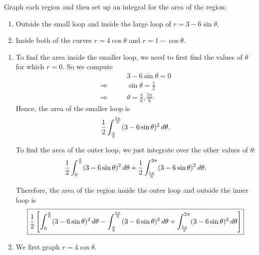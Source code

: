 \documentclass[]{ximera}
\begin{document}
\begin{problem}
Graph each region and then set up an integral for the area of the region:
	\begin{enumerate}
	\item  Outside the small loop and inside the large loop of $r = 3 - 6 \sin \theta$.
	\item  Inside both of the curves $r = 4 \cos \theta$ and $r = 1 - \cos \theta$.
	\end{enumerate} 
	
	
	\begin{freeResponse}
	\begin{enumerate}
	\item  
		
	To find the area inside the smaller loop, we need to first find the values of $\theta$ for which $r = 0$.
	So we compute
		\begin{align*}
		&3 - 6 \sin \theta = 0  \\
		\Longrightarrow \qquad &\sin \theta = \frac{1}{2}  \\
		\Longrightarrow \qquad &\theta = \frac{\pi}{6}, \frac{5 \pi}{6}.
		\end{align*}
	Hence, the area of the smaller loop is
		\[
		\frac{1}{2} \int_{\frac{\pi}{6}}^{\frac{5 \pi}{6}} (3 - 6 \sin \theta)^2 \,d \theta.
		\]
		
	To find the area of the outer loop, we just integrate over the other values of $\theta$:
		\[
		\frac{1}{2} \int_0^{\frac{\pi}{6}} (3 - 6 \sin \theta)^2 \,d \theta
		+ \frac{1}{2} \int_{\frac{5 \pi}{6}}^{2 \pi} (3 - 6 \sin \theta)^2 \,d \theta.
		\]
		
	Therefore, the area of the region inside the outer loop and outside the inner loop is
		\[
		\boxed{\frac{1}{2} \left[ \int_0^{\frac{\pi}{6}} (3 - 6 \sin \theta)^2 \,d \theta - \int_{\frac{\pi}{6}}^{\frac{5 \pi}{6}} (3 - 6 \sin \theta)^2 \,d \theta + \int_{\frac{5 \pi}{6}}^{2 \pi} (3 - 6 \sin \theta)^2 \,d \theta \right]    }
		\]
		
		
	
	\item  We first graph $r = 4 \cos \theta$.
		

\end{enumerate}
\end{freeResponse}
\end{problem}
\end{document}
